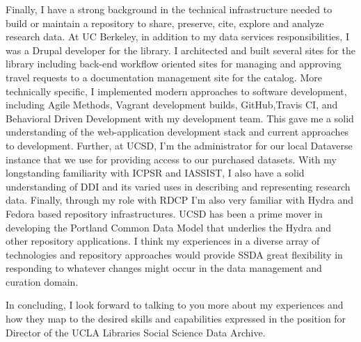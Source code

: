 \documentclass[11pt,letterpaper,sans]{moderncv}
\begin{document}
Finally, I have a strong background in the technical infrastructure needed to build or maintain a repository to share, preserve, cite, explore and analyze research data. At UC Berkeley, in addition to my data services responsibilities, I was a Drupal developer for the library. I architected and built several sites for the library including back-end workflow oriented sites for managing and approving travel requests to a documentation management site for the catalog. More technically specific, I implemented modern approaches to software development, including Agile Methods, Vagrant development builds, GitHub,Travis CI, and Behavioral Driven Development with my development team. This gave me a solid understanding of the web-application development stack and current approaches to development. Further, at UCSD, I’m the administrator for our local Dataverse instance that we use for providing access to our purchased datasets. With my longstanding familiarity with ICPSR and IASSIST, I also have a solid understanding of DDI and its varied uses in describing and representing research data.   Finally, through my role with RDCP I’m also very familiar with Hydra and Fedora based repository infrastructures. UCSD has been a prime mover in developing the Portland Common Data Model that underlies the Hydra and other repository applications.  I think my experiences in a diverse array of technologies and repository approaches would provide SSDA great flexibility in responding to whatever changes might occur in the data management and curation domain. 

In concluding, I look forward to talking to you more about my experiences and how they map to the desired skills and capabilities expressed in the position for Director of the UCLA Libraries Social Science Data Archive. 

\makeletterclosing
\fi
\end{document}
